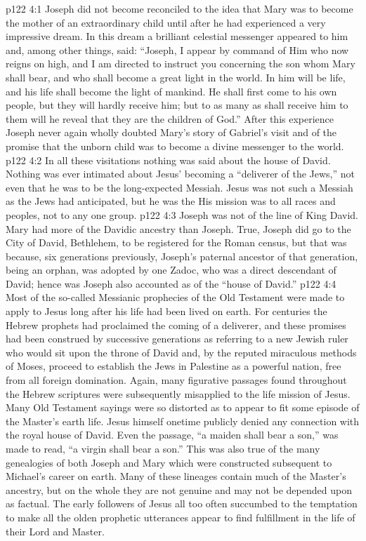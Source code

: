 \vs p122 4:1 Joseph did not become reconciled to the idea that Mary was to become the mother of an extraordinary child until after he had experienced a very impressive dream. In this dream a brilliant celestial messenger appeared to him and, among other things, said: “Joseph, I appear by command of Him who now reigns on high, and I am directed to instruct you concerning the son whom Mary shall bear, and who shall become a great light in the world. In him will be life, and his life shall become the light of mankind. He shall first come to his own people, but they will hardly receive him; but to as many as shall receive him to them will he reveal that they are the children of God.” After this experience Joseph never again wholly doubted Mary’s story of Gabriel’s visit and of the promise that the unborn child was to become a divine messenger to the world.
\vs p122 4:2 \pc In all these visitations nothing was said about the house of David. Nothing was ever intimated about Jesus’ becoming a “deliverer of the Jews,” not even that he was to be the long\hyp{}expected Messiah. Jesus was not such a Messiah as the Jews had anticipated, but he was the  His mission was to all races and peoples, not to any one group.
\vs p122 4:3 Joseph was not of the line of King David. Mary had more of the Davidic ancestry than Joseph. True, Joseph did go to the City of David, Bethlehem, to be registered for the Roman census, but that was because, six generations previously, Joseph’s paternal ancestor of that generation, being an orphan, was adopted by one Zadoc, who was a direct descendant of David; hence was Joseph also accounted as of the “house of David.”
\vs p122 4:4 Most of the so\hyp{}called Messianic prophecies of the Old Testament were made to apply to Jesus long after his life had been lived on earth. For centuries the Hebrew prophets had proclaimed the coming of a deliverer, and these promises had been construed by successive generations as referring to a new Jewish ruler who would sit upon the throne of David and, by the reputed miraculous methods of Moses, proceed to establish the Jews in Palestine as a powerful nation, free from all foreign domination. Again, many figurative passages found throughout the Hebrew scriptures were subsequently misapplied to the life mission of Jesus. Many Old Testament sayings were so distorted as to appear to fit some episode of the Master’s earth life. Jesus himself onetime publicly denied any connection with the royal house of David. Even the passage, “a maiden shall bear a son,” was made to read, “a virgin shall bear a son.” This was also true of the many genealogies of both Joseph and Mary which were constructed subsequent to Michael’s career on earth. Many of these lineages contain much of the Master’s ancestry, but on the whole they are not genuine and may not be depended upon as factual. The early followers of Jesus all too often succumbed to the temptation to make all the olden prophetic utterances appear to find fulfillment in the life of their Lord and Master.
